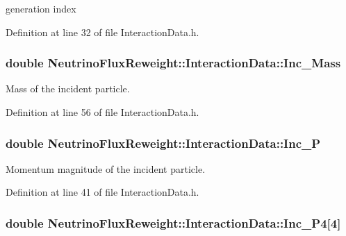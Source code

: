 generation index 



Definition at line 32 of file Interaction\-Data.\-h.

\hypertarget{class_neutrino_flux_reweight_1_1_interaction_data_abad3c8f9d2c30dc7105dc9d67125b7c8}{
\subsubsection[{Inc\-\_\-\-Mass}]{\setlength{\rightskip}{0pt plus 5cm}double Neutrino\-Flux\-Reweight\-::\-Interaction\-Data\-::\-Inc\-\_\-\-Mass}}\label{class_neutrino_flux_reweight_1_1_interaction_data_abad3c8f9d2c30dc7105dc9d67125b7c8}


Mass of the incident particle. 



Definition at line 56 of file Interaction\-Data.\-h.

\hypertarget{class_neutrino_flux_reweight_1_1_interaction_data_a0874ed9492a1ab56c775102dc4d0ad40}{
\subsubsection[{Inc\-\_\-\-P}]{\setlength{\rightskip}{0pt plus 5cm}double Neutrino\-Flux\-Reweight\-::\-Interaction\-Data\-::\-Inc\-\_\-\-P}}\label{class_neutrino_flux_reweight_1_1_interaction_data_a0874ed9492a1ab56c775102dc4d0ad40}


Momentum magnitude of the incident particle. 



Definition at line 41 of file Interaction\-Data.\-h.

\hypertarget{class_neutrino_flux_reweight_1_1_interaction_data_a0f74cee2bb5b42e953d6e5f7c6e06920}{
\subsubsection[{Inc\-\_\-\-P4}]{\setlength{\rightskip}{0pt plus 5cm}double Neutrino\-Flux\-Reweight\-::\-Interaction\-Data\-::\-Inc\-\_\-\-P4\mbox{[}4\mbox{]}}}\label{class_neutrino_flux_reweight_1_1_interaction_data_a0f74cee2bb5b42e953d6e5f7c6e06920}


